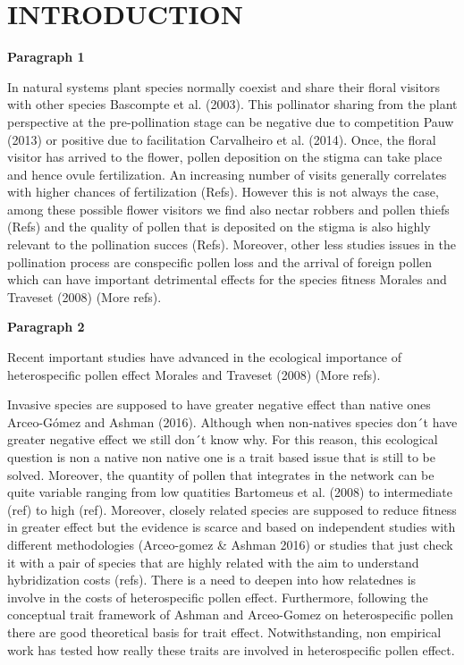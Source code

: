 \documentclass[11pt,a4paper]{article}
\begin{document}
\section{INTRODUCTION}\label{introduction}

\textbf{Paragraph 1}

In natural systems plant species normally coexist and share their floral
visitors with other species Bascompte et al. (2003). This pollinator
sharing from the plant perspective at the pre-pollination stage can be
negative due to competition Pauw (2013) or positive due to facilitation
Carvalheiro et al. (2014). Once, the floral visitor has arrived to the
flower, pollen deposition on the stigma can take place and hence ovule
fertilization. An increasing number of visits generally correlates with
higher chances of fertilization (Refs). However this is not always the
case, among these possible flower visitors we find also nectar robbers
and pollen thiefs (Refs) and the quality of pollen that is deposited on
the stigma is also highly relevant to the pollination succes (Refs).
Moreover, other less studies issues in the pollination process are
conspecific pollen loss and the arrival of foreign pollen which can have
important detrimental effects for the species fitness Morales and
Traveset (2008) (More refs).

\textbf{Paragraph 2}

Recent important studies have advanced in the ecological importance of
heterospecific pollen effect Morales and Traveset (2008) (More refs).

Invasive species are supposed to have greater negative effect than
native ones Arceo-Gómez and Ashman (2016). Although when non-natives
species don´t have greater negative effect we still don´t know why. For
this reason, this ecological question is non a native non native one is
a trait based issue that is still to be solved. Moreover, the quantity
of pollen that integrates in the network can be quite variable ranging
from low quatities Bartomeus et al. (2008) to intermediate (ref) to high
(ref). Moreover, closely related species are supposed to reduce fitness
in greater effect but the evidence is scarce and based on independent
studies with different methodologies (Arceo-gomez \& Ashman 2016) or
studies that just check it with a pair of species that are highly
related with the aim to understand hybridization costs (refs). There is
a need to deepen into how relatednes is involve in the costs of
heterospecific pollen effect. Furthermore, following the conceptual
trait framework of Ashman and Arceo-Gomez on heterospecific pollen there
are good theoretical basis for trait effect. Notwithstanding, non
empirical work has tested how really these traits are involved in
heterospecific pollen effect.
\end{document}
